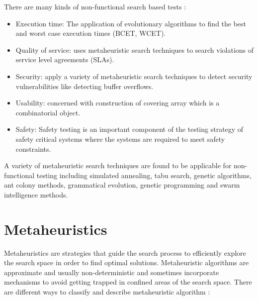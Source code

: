 \documentclass{report}
\begin{document}
There are many kinds of non-functional search based tests  \cite{Afzal2009a}:

\begin{itemize}
\item Execution time: The application of evolutionary algorithms to find the best and worst case execution times (BCET, WCET).
\item Quality of service: uses metaheuristic search techniques to search violations of service level agreements (SLAs).
\item Security: apply a variety of metaheuristic search techniques  to detect security vulnerabilities like detecting buffer overflows.
\item Usability: concerned with construction of covering array which is a combinatorial object.
\item Safety: Safety testing is an important component of the testing strategy of safety critical systems where the systems are required to meet safety constraints.
\end{itemize}

A variety of metaheuristic search techniques are found to be applicable for non-functional testing including simulated annealing, tabu search, genetic algorithms, ant colony methods, grammatical evolution, genetic programming and swarm intelligence methods.


\section{Metaheuristics}

Metaheuristics are strategies that guide the search process to efficiently explore the search space in order to find optimal solutions. Metaheuristic algorithms are approximate and usually non-deterministic and sometimes incorporate mechanisms to avoid getting trapped in confined areas of the search space. There are different ways to classify and describe metaheuristic algorithm \cite{Blum2003}:
\end{document}
